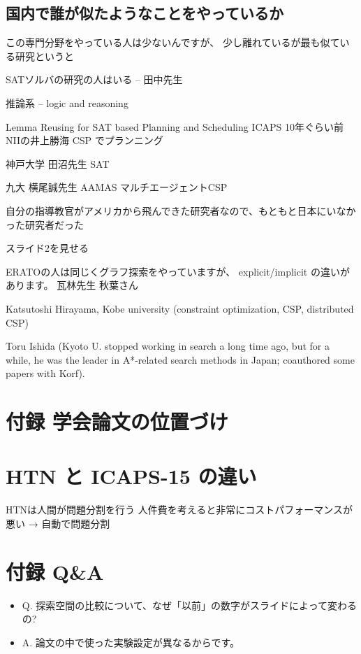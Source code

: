 \subsection{国内で誰が似たようなことをやっているか}
\label{sec-17-1}

この専門分野をやっている人は少ないんですが、
少し離れているが最も似ている研究というと

SATソルバの研究の人はいる -- 田中先生

推論系 -- logic and reasoning

Lemma Reusing for SAT based Planning and Scheduling
ICAPS 10年ぐらい前 NIIの井上勝海 CSP でプランニング

神戸大学
田沼先生 SAT

九大 横尾誠先生
AAMAS マルチエージェントCSP

自分の指導教官がアメリカから飛んできた研究者なので、もともと日本にいなかった研究者だった

スライド2を見せる

ERATOの人は同じくグラフ探索をやっていますが、
explicit/implicit の違いがあります。
瓦林先生
秋葉さん

Katsutoshi Hirayama, Kobe university  (constraint optimization, CSP, distributed CSP)

Toru Ishida (Kyoto U. stopped working in search a long time ago, but for a while, he was the leader in A*-related search methods in Japan; coauthored some papers with Korf).

\section{付録 学会論文の位置づけ}
\label{sec-18}

\section{HTN と ICAPS-15 の違い}
\label{sec-19}

HTNは人間が問題分割を行う
人件費を考えると非常にコストパフォーマンスが悪い
→ 自動で問題分割

\section{付録 Q\&A}
\label{sec-20}

\begin{itemize}
\item Q. 探索空間の比較について、なぜ「以前」の数字がスライドによって変わるの?
\item A. 論文の中で使った実験設定が異なるからです。
\end{itemize}

